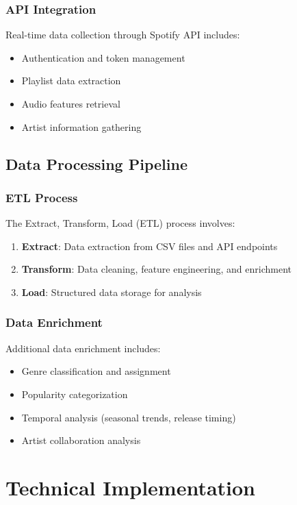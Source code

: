 \documentclass[12pt,a4paper]{article}
\begin{document}
\subsubsection{API Integration}
Real-time data collection through Spotify API includes:
\begin{itemize}
    \item Authentication and token management
    \item Playlist data extraction
    \item Audio features retrieval
    \item Artist information gathering
\end{itemize}

\subsection{Data Processing Pipeline}
\subsubsection{ETL Process}
The Extract, Transform, Load (ETL) process involves:
\begin{enumerate}
    \item \textbf{Extract}: Data extraction from CSV files and API endpoints
    \item \textbf{Transform}: Data cleaning, feature engineering, and enrichment
    \item \textbf{Load}: Structured data storage for analysis
\end{enumerate}

\subsubsection{Data Enrichment}
Additional data enrichment includes:
\begin{itemize}
    \item Genre classification and assignment
    \item Popularity categorization
    \item Temporal analysis (seasonal trends, release timing)
    \item Artist collaboration analysis
\end{itemize}

\section{Technical Implementation}
\end{document}
